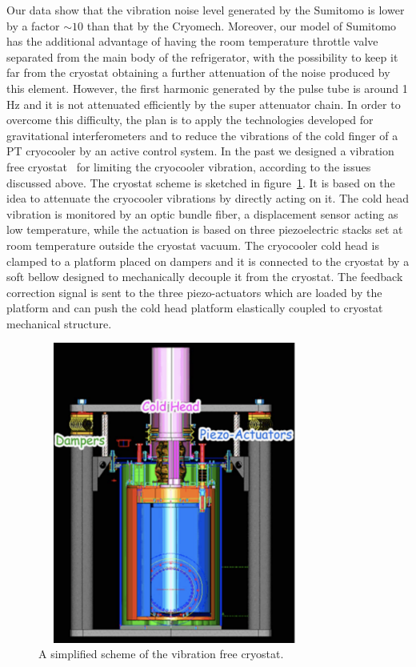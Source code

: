 Our data show that the vibration noise level generated by the Sumitomo is lower by a factor $\sim 10$ than that by the Cryomech. 
Moreover, our model of Sumitomo has the additional advantage of having the room temperature throttle valve separated from the main body of the refrigerator, with the possibility to keep it far from the cryostat obtaining a further attenuation of the noise produced by this element.
However, the first harmonic generated by the pulse tube is around 1 Hz and it is not attenuated efficiently by the super attenuator chain.  In order to overcome this difficulty, the plan is to apply the technologies developed for  gravitational interferometers and to reduce the vibrations of the cold finger of a PT  cryocooler by an active control system.  In the past we  designed a vibration free cryostat~\cite{VFC}  for limiting the cryocooler vibration, according to the issues discussed above.  The cryostat scheme is sketched in  figure~\ref{fig:cryostat_scheme}.  It is based on the idea to attenuate the cryocooler vibrations by directly acting on it. 
 The cold head vibration  is monitored by  an  optic bundle fiber, a displacement sensor acting as low temperature,  while the actuation is based  on three piezoelectric stacks set  at room temperature outside the cryostat vacuum.  
The cryocooler cold head is clamped to a platform placed on dampers and it is connected to the cryostat by a soft  bellow designed to mechanically decouple it from the cryostat. The feedback correction signal is sent to the three piezo-actuators which are loaded by the platform and can push the cold head platform elastically coupled to cryostat mechanical structure.

\begin{figure}[htbp]
\begin{center}
\includegraphics[width=9cm, height=9.9cm]{./Sec_SiteInfra/Figures/cryostat_scheme.pdf}
\caption{{A simplified scheme of the vibration free cryostat.}}
\label{fig:cryostat_scheme}
\end{center}
\end{figure}


